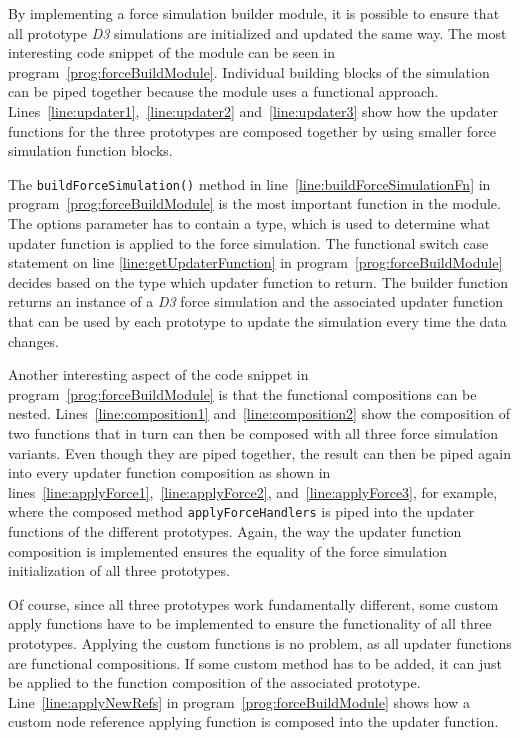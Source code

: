 By implementing a force simulation builder module, it is possible to ensure that all prototype \emph{D3} simulations are initialized and updated the same way. The most interesting code snippet of the module can be seen in program~\ref{prog:forceBuildModule}. Individual building blocks of the simulation can be piped together because the module uses a functional approach. Lines~\ref{line:updater1},~\ref{line:updater2} and~\ref{line:updater3} show how the updater functions for the three prototypes are composed together by using smaller force simulation function blocks.

The \texttt{buildForceSimulation()} method in line~\ref{line:buildForceSimulationFn} in program~\ref{prog:forceBuildModule} is the most important function in the module. The options parameter has to contain a type, which is used to determine what updater function is applied to the force simulation. The functional switch case statement on line \ref{line:getUpdaterFunction} in program~\ref{prog:forceBuildModule} decides based on the type which updater function to return. The builder function returns an instance of a \emph{D3} force simulation and the associated updater function that can be used by each prototype to update the simulation every time the data changes.

Another interesting aspect of the code snippet in program~\ref{prog:forceBuildModule} is that the functional compositions can be nested. Lines~\ref{line:composition1} and~\ref{line:composition2} show the composition of two functions that in turn can then be composed with all three force simulation variants. Even though they are piped together, the result can then be piped again into every updater function composition as shown in lines~\ref{line:applyForce1},~\ref{line:applyForce2}, and~\ref{line:applyForce3}, for example, where the composed method \texttt{applyForceHandlers} is piped into the updater functions of the different prototypes. Again, the way the updater function composition is implemented ensures the equality of the force simulation initialization of all three prototypes.

Of course, since all three prototypes work fundamentally different, some custom apply functions have to be implemented to ensure the functionality of all three prototypes. Applying the custom functions is no problem, as all updater functions are functional compositions. If some custom method has to be added, it can just be applied to the function composition of the associated prototype. Line~\ref{line:applyNewRefs} in program~\ref{prog:forceBuildModule} shows how a custom node reference applying function is composed into the updater function.

